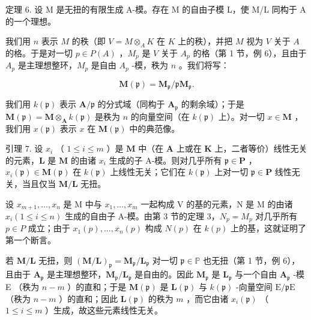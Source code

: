 定理 6. 设 M 是无扭的有限生成 A-模。存在 M 的自由子模 L，使 M/L 同构于 A 的一个理想。

我们用 \(n\) 表示 \(M\) 的秩（即 \(V = M \otimes_{A} K\) 在 \(K\) 上的秩），并把 \(M\) 视为 \(V\) 关于 \(A\) 的格。于是对一切 \(p \in P(A)\) ，\(M_p\) 是 \(V\) 关于 \(A_p\) 的格（第 1 节，例 6），且由于 \(A_p\) 是主理想整环，\(M_p\) 是自由 \(A_p\) -模，秩为 \(n\) 。我们将写：

\[
\mathbf {M} (\mathfrak {p}) = \mathbf {M} _ {\mathfrak {p}} / \mathfrak {p} \mathbf {M} _ {\mathfrak {p}}.
\]

我们用 \(k(\mathfrak{p})\) 表示 \(\mathbf{A} / \mathfrak{p}\) 的分式域（同构于 \(\mathbf{A}_{\mathfrak{p}}\) 的剩余域）；于是 \(\mathbf{M}(\mathfrak{p}) = \mathbf{M} \otimes_{\mathbf{A}} k(\mathfrak{p})\) 是秩为 \(n\) 的向量空间（在 \(k(\mathfrak{p})\) 上）。对一切 \(x \in \mathbf{M}\) ，我们用 \(x(\mathfrak{p})\) 表示 \(x\) 在 \(\mathbf{M}(\mathfrak{p})\) 中的典范像。

引理 7. 设 \(x_{i}\) （ \(1 \leqslant i \leqslant m\) ）是 \(\mathbf{M}\) 中（在 \(\mathbf{A}\) 上或在 \(\mathbf{K}\) 上，二者等价）线性无关的元素，\(\mathbf{L}\) 是 \(\mathbf{M}\) 的由诸 \(x_{i}\) 生成的子 A-模。则对几乎所有 \(\mathfrak{p} \in \mathbf{P}\) ，\(x_{i}(\mathfrak{p}) \in \mathbf{M}(\mathfrak{p})\) 在 \(k(\mathfrak{p})\) 上线性无关；它们在 \(k(\mathfrak{p})\) 上对一切 \(\mathfrak{p} \in \mathbf{P}\) 线性无关，当且仅当 \(\mathbf{M}/\mathbf{L}\) 无扭。

设 \(x_{m+1}, \ldots, x_n\) 是 M 中与 \(x_1, \ldots, x_m\) 一起构成 V 的基的元素，N 是 M 的由诸 \(x_i (1 \leqslant i \leqslant n)\) 生成的自由子 A-模。由第 3 节的定理 3，\(N_p = M_p\) 对几乎所有 \(p \in P\) 成立；由于 \(x_1(p), \ldots, x_n(p)\) 构成 \(N(p)\) 在 \(k(p)\) 上的基，这就证明了第一个断言。

若 \(\mathbf{M} / \mathbf{L}\) 无扭，则 \((\mathbf{M} / \mathbf{L})_{\mathfrak{p}} = \mathbf{M}_{\mathfrak{p}} / \mathbf{L}_{\mathfrak{p}}\) 对一切 \(\mathfrak{p} \in \mathbb{P}\) 也无扭（第 1 节，例 6），且由于 \(\mathbf{A}_{\mathfrak{p}}\) 是主理想整环，\(\mathbf{M}_{\mathfrak{p}} / \mathbf{L}_{\mathfrak{p}}\) 是自由的。因此 \(\mathbf{M}_{\mathfrak{p}}\) 是 \(\mathbf{L}_{\mathfrak{p}}\) 与一个自由 \(\mathbf{A}_{\mathfrak{p}}\) -模 E （秩为 \(n - m\) ）的直和；于是 \(\mathbf{M}(\mathfrak{p})\) 是 \(\mathbf{L}(\mathfrak{p})\) 与 \(k(\mathfrak{p})\) -向量空间 \(\mathrm{E} / \mathfrak{p}\mathrm{E}\) （秩为 \(n - m\) ）的直和；因此 \(\mathbf{L}(\mathfrak{p})\) 的秩为 \(m\) ，而它由诸 \(x_{i}(\mathfrak{p})\) （ \(1 \leqslant i \leqslant m\) ）生成，故这些元素线性无关。

